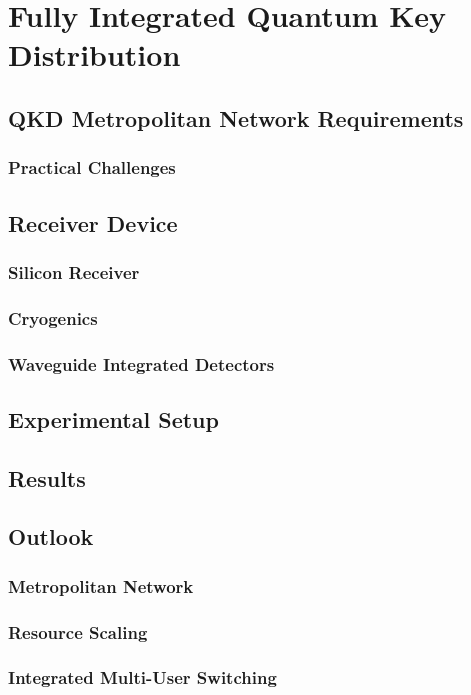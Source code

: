 %
%
\glsresetall
\graphicspath{{./chapters/chapter05/fig05/}}

\let\textcircled=\pgftextcircled
\chapter{Fully Integrated Quantum Key Distribution}
\label{chap:node}

\section{QKD Metropolitan Network Requirements}
\label{sec:sec05}

\subsection{Practical Challenges}

\section{Receiver Device}

\subsection{Silicon Receiver}

\subsection{Cryogenics}

\subsection{Waveguide Integrated Detectors}

\section{Experimental Setup}

\section{Results}

\section{Outlook}

\subsection{Metropolitan Network}

\subsection{Resource Scaling}

\subsection{Integrated Multi-User Switching}

